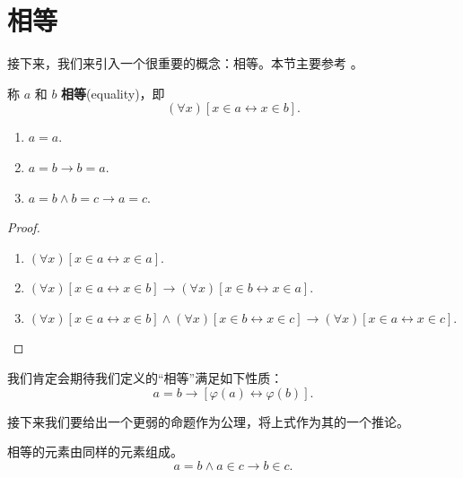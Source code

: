 \section{相等}

接下来，我们来引入一个很重要的概念：相等。本节主要参考 \cite[chp. 2]{takeuti12}。

\begin{definition}[相等]
  称 \(a\) 和 \(b\) \textbf{相等}(equality)，即
  \begin{equation*}
    (\forall x)[x\in a\leftrightarrow x\in b].
  \end{equation*}
\end{definition}

\begin{proposition}[相等的性质]\emptyline \label{prop:相等的性质}
  \begin{enumerate}
    \item \(a=a\).
    \item \(a=b\to b=a\).
    \item \(a=b\land b=c\to a=c\).
  \end{enumerate}
\end{proposition}

\begin{proof}\emptyline
  \begin{enumerate}
    \item \((\forall x)[x\in a\leftrightarrow x\in a]\).
    \item \((\forall x)[x\in a\leftrightarrow x\in b]\rightarrow (\forall x)[x\in b\leftrightarrow x\in a]\).
    \item \((\forall x)[x\in a\leftrightarrow x\in b]\land(\forall x)[x\in b\leftrightarrow x\in c]\to (\forall x)[x\in a\leftrightarrow x\in c]\).\qedhere
  \end{enumerate}
\end{proof}

我们肯定会期待我们定义的“相等”满足如下性质：
\begin{equation*}
  a=b\rightarrow [\varphi(a)\leftrightarrow \varphi(b)].
\end{equation*}

接下来我们要给出一个更弱的命题作为公理，将上式作为其的一个推论。

\begin{axiom}[外延公理] 相等的元素由同样的元素组成。 \label{axiom:外延公理}
  \begin{equation*}
    a=b\land a\in c\rightarrow b\in c.
  \end{equation*}
\end{axiom}

